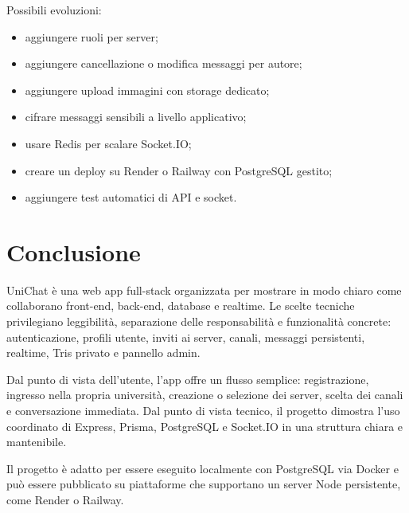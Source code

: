\documentclass[11pt,a4paper]{article}
\begin{document}
Possibili evoluzioni:

\begin{itemize}
  \item aggiungere ruoli per server;
  \item aggiungere cancellazione o modifica messaggi per autore;
  \item aggiungere upload immagini con storage dedicato;
  \item cifrare messaggi sensibili a livello applicativo;
  \item usare Redis per scalare Socket.IO;
  \item creare un deploy su Render o Railway con PostgreSQL gestito;
  \item aggiungere test automatici di API e socket.
\end{itemize}

\section{Conclusione}

UniChat è una web app full-stack organizzata per mostrare in modo chiaro come collaborano front-end, back-end, database e realtime. Le scelte tecniche privilegiano leggibilità, separazione delle responsabilità e funzionalità concrete: autenticazione, profili utente, inviti ai server, canali, messaggi persistenti, realtime, Tris privato e pannello admin.

Dal punto di vista dell'utente, l'app offre un flusso semplice: registrazione, ingresso nella propria università, creazione o selezione dei server, scelta dei canali e conversazione immediata. Dal punto di vista tecnico, il progetto dimostra l'uso coordinato di Express, Prisma, PostgreSQL e Socket.IO in una struttura chiara e mantenibile.

Il progetto è adatto per essere eseguito localmente con PostgreSQL via Docker e può essere pubblicato su piattaforme che supportano un server Node persistente, come Render o Railway.
\end{document}
